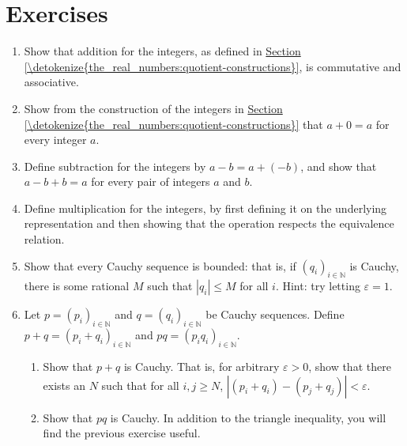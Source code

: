 \documentclass[letterpaper,10pt,english]{sphinxmanual}
\begin{document}
\section{Exercises}
\label{\detokenize{the_real_numbers:exercises}}\begin{enumerate}
%
\item {} 
\sphinxAtStartPar
Show that addition for the integers, as defined in \hyperref[\detokenize{the_real_numbers:quotient-constructions}]{Section \ref{\detokenize{the_real_numbers:quotient-constructions}}}, is commutative and associative.

\item {} 
\sphinxAtStartPar
Show from the construction of the integers in \hyperref[\detokenize{the_real_numbers:quotient-constructions}]{Section \ref{\detokenize{the_real_numbers:quotient-constructions}}} that \(a + 0 = a\) for every integer \(a\).

\item {} 
\sphinxAtStartPar
Define subtraction for the integers by \(a - b = a + (-b)\), and show that \(a - b + b = a\) for every pair of integers \(a\) and \(b\).

\item {} 
\sphinxAtStartPar
Define multiplication for the integers, by first defining it on the underlying representation and then showing that the operation respects the equivalence relation.

\item {} 
\sphinxAtStartPar
Show that every Cauchy sequence is bounded: that is, if \((q_i)_{i \in \mathbb{N}}\) is Cauchy, there is some rational \(M\) such that \(|q_i| \leq M\) for all \(i\). Hint: try letting \(\varepsilon = 1\).

\item {} 
\sphinxAtStartPar
Let \(p = (p_i)_{i \in \mathbb{N}}\) and \(q = (q_i)_{i \in \mathbb{N}}\) be Cauchy sequences. Define \(p + q = (p_i + q_i)_{i \in \mathbb{N}}\) and \(p q = (p_i  q_i)_{i \in \mathbb{N}}\).
\begin{enumerate}
%
\item {} 
\sphinxAtStartPar
Show that \(p + q\) is Cauchy. That is, for arbitrary \(\varepsilon > 0\), show that there exists an \(N\) such that for all \(i, j \geq N\), \(|(p_i + q_i) - (p_j + q_j)| < \varepsilon\).

\item {} 
\sphinxAtStartPar
Show that \(p q\) is Cauchy. In addition to the triangle inequality, you will find the previous exercise useful.


\end{enumerate}
\end{enumerate}
\end{document}
